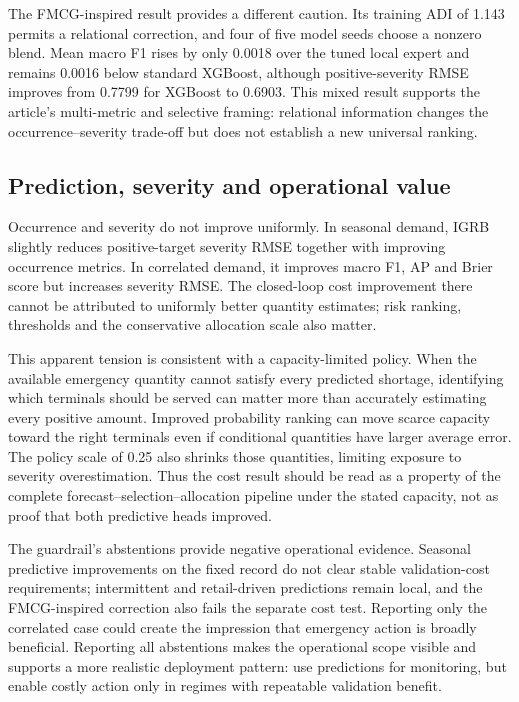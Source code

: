 \documentclass[11pt,a4paper]{article}
\begin{document}
The FMCG-inspired result provides a different caution. Its training ADI of 1.143 permits a relational correction, and four of five model seeds choose a nonzero blend. Mean macro F1 rises by only 0.0018 over the tuned local expert and remains 0.0016 below standard XGBoost, although positive-severity RMSE improves from 0.7799 for XGBoost to 0.6903. This mixed result supports the article's multi-metric and selective framing: relational information changes the occurrence--severity trade-off but does not establish a new universal ranking.

\subsection{Prediction, severity and operational value}

Occurrence and severity do not improve uniformly. In seasonal demand, IGRB slightly reduces positive-target severity RMSE together with improving occurrence metrics. In correlated demand, it improves macro F1, AP and Brier score but increases severity RMSE. The closed-loop cost improvement there cannot be attributed to uniformly better quantity estimates; risk ranking, thresholds and the conservative allocation scale also matter.

This apparent tension is consistent with a capacity-limited policy. When the available emergency quantity cannot satisfy every predicted shortage, identifying which terminals should be served can matter more than accurately estimating every positive amount. Improved probability ranking can move scarce capacity toward the right terminals even if conditional quantities have larger average error. The policy scale of 0.25 also shrinks those quantities, limiting exposure to severity overestimation. Thus the cost result should be read as a property of the complete forecast--selection--allocation pipeline under the stated capacity, not as proof that both predictive heads improved.

The guardrail's abstentions provide negative operational evidence. Seasonal predictive improvements on the fixed record do not clear stable validation-cost requirements; intermittent and retail-driven predictions remain local, and the FMCG-inspired correction also fails the separate cost test. Reporting only the correlated case could create the impression that emergency action is broadly beneficial. Reporting all abstentions makes the operational scope visible and supports a more realistic deployment pattern: use predictions for monitoring, but enable costly action only in regimes with repeatable validation benefit.
\end{document}
